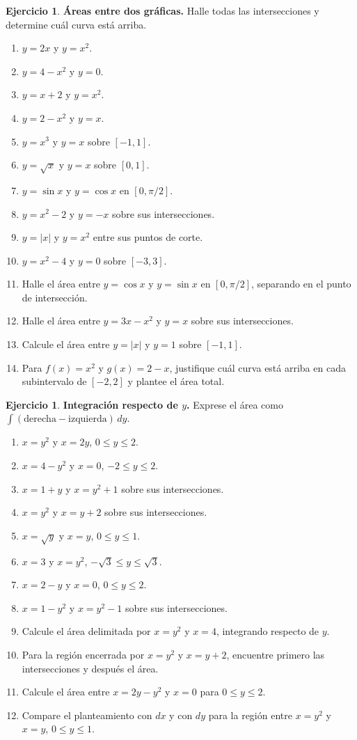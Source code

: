\documentclass[12pt]{article}
\theoremstyle{definition}
\newtheorem{Ejer}[teorema]{Ejercicio}
\theoremstyle{remark}
\begin{document}
\begin{Ejer}\textbf{Áreas entre dos gráficas.} Halle todas las intersecciones y determine cuál curva está arriba.
\begin{enumerate}[resume=banco3]
\item $y=2x$ y $y=x^2$.
\item $y=4-x^2$ y $y=0$.
\item $y=x+2$ y $y=x^2$.
\item $y=2-x^2$ y $y=x$.
\item $y=x^3$ y $y=x$ sobre $[-1,1]$.
\item $y=\sqrt x$ y $y=x$ sobre $[0,1]$.
\item $y=\sin x$ y $y=\cos x$ en $[0,\pi/2]$.
\item $y=x^2-2$ y $y=-x$ sobre sus intersecciones.
\item $y=|x|$ y $y=x^2$ entre sus puntos de corte.
\item $y=x^2-4$ y $y=0$ sobre $[-3,3]$.
\item Halle el área entre $y=\cos x$ y $y=\sin x$ en $[0,\pi/2]$, separando en el punto de intersección.
\item Halle el área entre $y=3x-x^2$ y $y=x$ sobre sus intersecciones.
\item Calcule el área entre $y=\lvert x\rvert$ y $y=1$ sobre $[-1,1]$.
\item Para $f(x)=x^2$ y $g(x)=2-x$, justifique cuál curva está arriba en cada subintervalo de $[-2,2]$ y plantee el área total.
\end{enumerate}
\end{Ejer}

\begin{Ejer}\textbf{Integración respecto de $y$.} Exprese el área como $\int(\text{derecha}-\text{izquierda})\,dy$.
\begin{enumerate}[resume=banco3]
\item $x=y^2$ y $x=2y$, $0\le y\le2$.
\item $x=4-y^2$ y $x=0$, $-2\le y\le2$.
\item $x=1+y$ y $x=y^2+1$ sobre sus intersecciones.
\item $x=y^2$ y $x=y+2$ sobre sus intersecciones.
\item $x=\sqrt y$ y $x=y$, $0\le y\le1$.
\item $x=3$ y $x=y^2$, $-\sqrt3\le y\le\sqrt3$.
\item $x=2-y$ y $x=0$, $0\le y\le2$.
\item $x=1-y^2$ y $x=y^2-1$ sobre sus intersecciones.
\item Calcule el área delimitada por $x=y^2$ y $x=4$, integrando respecto de $y$.
\item Para la región encerrada por $x=y^2$ y $x=y+2$, encuentre primero las intersecciones y después el área.
\item Calcule el área entre $x=2y-y^2$ y $x=0$ para $0\le y\le2$.
\item Compare el planteamiento con $dx$ y con $dy$ para la región entre $x=y^2$ y $x=y$, $0\le y\le1$.
\end{enumerate}
\end{Ejer}
\end{document}
